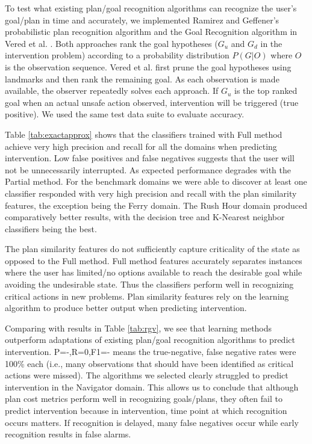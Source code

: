 To test what existing plan/goal recognition algorithms can recognize the user's goal/plan in time and accurately, we implemented Ramirez and Geffener's probabilistic plan recognition algorithm \cite{ramirez2010probabilistic} and the Goal Recognition algorithm in Vered et al. . Both approaches rank the goal hypotheses ($G_u$ and $G_d$ in the intervention problem) according to a probability distribution $P(G|O)$ where $O$ is the observation sequence. Vered et al. first prune the goal hypotheses using landmarks and then rank the remaining goal. As each observation is made available, the observer repeatedly solves each approach. If $G_u$ is the top ranked goal when an actual unsafe action observed, intervention will be triggered (true positive). We used the same test data suite to evaluate accuracy.

Table \ref{tab:exactapprox} shows that the classifiers trained with Full method achieve very high precision and recall for all the domains when predicting intervention. Low false positives and false negatives suggests that the user will not be unnecessarily interrupted. As expected performance degrades with the Partial method. For the benchmark domains we were able to discover at least one classifier responded with very high precision and recall with the plan similarity features, the exception being the Ferry domain. 
The Rush Hour domain produced comparatively better results, with the decision tree and K-Nearest neighbor classifiers being the best. 

The plan similarity features do not sufficiently capture criticality of the state as opposed to  the Full method. Full method features accurately separates instances where the user has limited/no options available to reach the desirable goal while avoiding the undesirable state. Thus the classifiers perform well in recognizing critical actions in new problems. Plan similarity features rely on the learning algorithm to produce better output when predicting intervention. 

Comparing with results in Table \ref{tab:rgv}, we see that learning methods outperform adaptations of existing plan/goal recognition algorithms to predict intervention. P=-,R=0,F1=- means the true-negative, false negative rates were 100\%  each (i.e., many observations that should have been identified as critical actions were missed). The algorithms we selected clearly struggled to predict intervention in the Navigator domain. This allows us to conclude that although plan cost  metrics perform well in recognizing goals/plans, they often fail to predict intervention because in intervention, time point at which recognition occurs matters. If recognition is delayed, many false negatives occur while early recognition results in false alarms.


